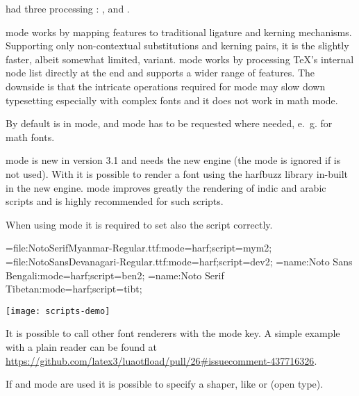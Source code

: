           had three \OpenType processing
         :
         ,  and .

          mode works by mapping \OpenType
         features to traditional \TEX ligature and kerning mechanisms.
         Supporting only non-contextual substitutions and kerning
         pairs, it is the slightly faster, albeit somewhat limited, variant.
          mode works by processing \TeX’s internal
         node list directly at the \LUA end and supports
         a wider range of \OpenType features.
         The downside is that the intricate operations required for
          mode may slow down typesetting especially
         with complex fonts and it does not work in math mode.

         By default  is in 
         mode, and  mode has to be requested where needed,
         e.~g. for math fonts.

          mode is new in version 3.1 and needs the new  engine (the mode is ignored if  is not used). With it is possible to render a font using the harfbuzz library in-built in the new engine.  mode improves greatly the rendering of indic and arabic scripts and is highly recommended for such scripts.

         When using  mode it is required to set also the script correctly.


         \beginlisting
         \font\burmesefont={file:NotoSerifMyanmar-Regular.ttf:mode=harf;script=mym2;}
         \font\devafont={file:NotoSansDevanagari-Regular.ttf:mode=harf;script=dev2;}
         \font\banglafont={name:Noto Sans Bengali:mode=harf;script=ben2;}
         \font\tibetanfont={name:Noto Serif Tibetan:mode=harf;script=tibt;}
         \endlisting

         \texttt{[image: scripts-demo]}


         It is possible to call other font renderers with the mode key. A simple example with a plain reader can be found at \url{https://github.com/latex3/luaotfload/pull/26#issuecomment-437716326}.

  \endaltitem
   \label{shaper-tag}
  If  and  mode are used it is possible to specify a shaper, like  or  (open type).

